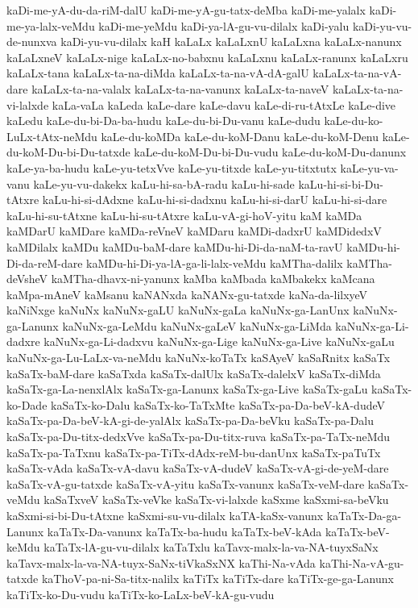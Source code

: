 {kaDi-me-yA-du-da-riM-dalU
kaDi-me-yA-gu-tatx-deMba
kaDi-me-yalalx
kaDi-me-ya-lalx-veMdu
kaDi-me-yeMdu
kaDi-ya-lA-gu-vu-dilalx
kaDi-yalu
kaDi-yu-vu-de-nunxva
kaDi-yu-vu-dilalx
kaH
kaLaLx
kaLaLxnU
kaLaLxna
kaLaLx-nanunx
kaLaLxneV
kaLaLx-nige
kaLaLx-no-babxnu
kaLaLxnu
kaLaLx-ranunx
kaLaLxru
kaLaLx-tana
kaLaLx-ta-na-diMda
kaLaLx-ta-na-vA-dA-galU
kaLaLx-ta-na-vA-dare
kaLaLx-ta-na-valalx
kaLaLx-ta-na-vanunx
kaLaLx-ta-naveV
kaLaLx-ta-na-vi-lalxde
kaLa-vaLa
kaLeda
kaLe-dare
kaLe-davu
kaLe-di-ru-tAtxLe
kaLe-dive
kaLedu
kaLe-du-bi-Da-ba-hudu
kaLe-du-bi-Du-vanu
kaLe-dudu
kaLe-du-ko-LuLx-tAtx-neMdu
kaLe-du-koMDa
kaLe-du-koM-Danu
kaLe-du-koM-Denu
kaLe-du-koM-Du-bi-Du-tatxde
kaLe-du-koM-Du-bi-Du-vudu
kaLe-du-koM-Du-danunx
kaLe-ya-ba-hudu
kaLe-yu-tetxVve
kaLe-yu-titxde
kaLe-yu-titxtutx
kaLe-yu-va-vanu
kaLe-yu-vu-dakekx
kaLu-hi-sa-bA-radu
kaLu-hi-sade
kaLu-hi-si-bi-Du-tAtxre
kaLu-hi-si-dAdxne
kaLu-hi-si-dadxnu
kaLu-hi-si-darU
kaLu-hi-si-dare
kaLu-hi-su-tAtxne
kaLu-hi-su-tAtxre
kaLu-vA-gi-hoV-yitu
kaM
kaMDa
kaMDarU
kaMDare
kaMDa-reVneV
kaMDaru
kaMDi-dadxrU
kaMDidedxV
kaMDilalx
kaMDu
kaMDu-baM-dare
kaMDu-hi-Di-da-naM-ta-ravU
kaMDu-hi-Di-da-reM-dare
kaMDu-hi-Di-ya-lA-ga-li-lalx-veMdu
kaMTha-dalilx
kaMTha-deVsheV
kaMTha-dhavx-ni-yanunx
kaMba
kaMbada
kaMbakekx
kaMcana
kaMpa-mAneV
kaMsanu
kaNANxda
kaNANx-gu-tatxde
kaNa-da-lilxyeV
kaNiNxge
kaNuNx
kaNuNx-gaLU
kaNuNx-gaLa
kaNuNx-ga-LanUnx
kaNuNx-ga-Lanunx
kaNuNx-ga-LeMdu
kaNuNx-gaLeV
kaNuNx-ga-LiMda
kaNuNx-ga-Li-dadxre
kaNuNx-ga-Li-dadxvu
kaNuNx-ga-Lige
kaNuNx-ga-Live
kaNuNx-gaLu
kaNuNx-ga-Lu-LaLx-va-neMdu
kaNuNx-koTaTx
kaSAyeV
kaSaRnitx
kaSaTx
kaSaTx-baM-dare
kaSaTxda
kaSaTx-dalUlx
kaSaTx-dalelxV
kaSaTx-diMda
kaSaTx-ga-La-nenxlAlx
kaSaTx-ga-Lanunx
kaSaTx-ga-Live
kaSaTx-gaLu
kaSaTx-ko-Dade
kaSaTx-ko-Dalu
kaSaTx-ko-TaTxMte
kaSaTx-pa-Da-beV-kA-dudeV
kaSaTx-pa-Da-beV-kA-gi-de-yalAlx
kaSaTx-pa-Da-beVku
kaSaTx-pa-Dalu
kaSaTx-pa-Du-titx-dedxVve
kaSaTx-pa-Du-titx-ruva
kaSaTx-pa-TaTx-neMdu
kaSaTx-pa-TaTxnu
kaSaTx-pa-TiTx-dAdx-reM-bu-danUnx
kaSaTx-paTuTx
kaSaTx-vAda
kaSaTx-vA-davu
kaSaTx-vA-dudeV
kaSaTx-vA-gi-de-yeM-dare
kaSaTx-vA-gu-tatxde
kaSaTx-vA-yitu
kaSaTx-vanunx
kaSaTx-veM-dare
kaSaTx-veMdu
kaSaTxveV
kaSaTx-veVke
kaSaTx-vi-lalxde
kaSxme
kaSxmi-sa-beVku
kaSxmi-si-bi-Du-tAtxne
kaSxmi-su-vu-dilalx
kaTA-kaSx-vanunx
kaTaTx-Da-ga-Lanunx
kaTaTx-Da-vanunx
kaTaTx-ba-hudu
kaTaTx-beV-kAda
kaTaTx-beV-keMdu
kaTaTx-lA-gu-vu-dilalx
kaTaTxlu
kaTavx-malx-la-va-NA-tuyxSaNx
kaTavx-malx-la-va-NA-tuyx-SaNx-tiVkaSxNX
kaThi-Na-vAda
kaThi-Na-vA-gu-tatxde
kaThoV-pa-ni-Sa-titx-nalilx
kaTiTx
kaTiTx-dare
kaTiTx-ge-ga-Lanunx
kaTiTx-ko-Du-vudu
kaTiTx-ko-LaLx-beV-kA-gu-vudu
}
